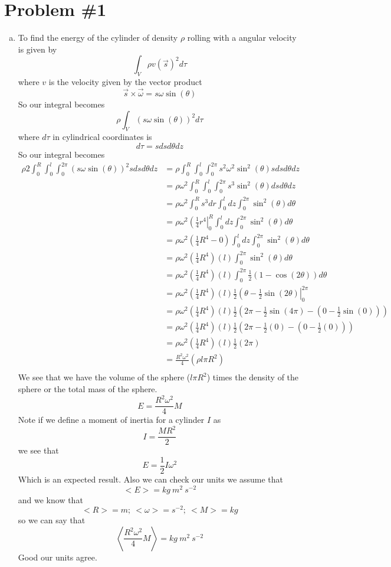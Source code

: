 \documentclass[11pt]{article}
\numberwithin{equation}{section}
\begin{document}


\section{Problem \#1}
\begin{enumerate}[(a)]
\item
To find the energy of the cylinder of density $\rho$ rolling with a angular velocity is given by
$$\int_V \rho v(\vec{s})^2 d\tau$$
where $v$ is the velocity given by the vector product
$$\vec{s}\times\vec{\omega} = s\omega\sin(\theta)$$
So our integral becomes
$${\rho}\int_V  (s\omega\sin(\theta))^2 d\tau$$
where $d\tau$ in cylindrical coordinates is 
$$d\tau = sdsd\theta dz$$
So our integral becomes
\begin{align*}
{\rho}{2}\int_0^R\int_0^l\int_0^{2\pi} (s\omega\sin(\theta))^2 sdsd\theta dz &= {\rho}\int_0^R\int_0^l\int_0^{2\pi} s^2\omega^2\sin^2(\theta) sdsd\theta dz \\
&= {\rho\omega^2}\int_0^R\int_0^l\int_0^{2\pi} s^3\sin^2(\theta)dsd\theta dz \\
&= {\rho\omega^2}\int_0^Rs^3dr\int_0^ldz\int_0^{2\pi}\sin^2(\theta)d\theta \\
&= {\rho\omega^2}\left(\frac{1}{4}r^4\right|_0^R\int_0^ldz\int_0^{2\pi}\sin^2(\theta)d\theta \\
&= {\rho\omega^2}\left(\frac{1}{4}R^4-0\right)\int_0^ldz\int_0^{2\pi}\sin^2(\theta)d\theta \\
&= {\rho\omega^2}\left(\frac{1}{4}R^4\right)(l)\int_0^{2\pi}\sin^2(\theta)d\theta \\
&= {\rho\omega^2}\left(\frac{1}{4}R^4\right)(l)\int_0^{2\pi}\frac{1}{2}(1-\cos(2\theta))d\theta \\
&= {\rho\omega^2}\left(\frac{1}{4}R^4\right)(l)\frac{1}{2}\left(\theta-\frac{1}{2}\sin(2\theta)\right|_0^{2\pi}\\
&= {\rho\omega^2}\left(\frac{1}{4}R^4\right)(l)\frac{1}{2}\left(2\pi-\frac{1}{2}\sin(4\pi)-\left(0-\frac{1}{2}\sin(0)\right)\right)\\
&= {\rho\omega^2}\left(\frac{1}{4}R^4\right)(l)\frac{1}{2}\left(2\pi-\frac{1}{2}(0)-\left(0-\frac{1}{2}(0)\right)\right)\\
&= {\rho\omega^2}\left(\frac{1}{4}R^4\right)(l)\frac{1}{2}\left(2\pi\right)\\
&= \frac{R^2\omega^2}{4}\left(\rho l\pi R^2\right)\\
\end{align*}
We see that we have the volume of the sphere ($l\pi R^2$) times the density of the sphere or the total mass of the sphere.
$$E = \frac{R^2\omega^2}{4}M$$
Note if we define a moment of inertia for a cylinder $I$ as 
$$I = \frac{MR^2}{2}$$
we see that
$$E = \frac{1}{2}I\omega^2$$
Which is an expected result. Also we can check our units we assume that $$<E> = kg\ m^2\ s^{-2}$$
and we know that
$$<R>=m;\ <\omega>=s^{-2};\ <M>=kg$$
so we can say that
$$\left<\frac{R^2\omega^2}{4}M\right> = kg\ {m^2\ s^{-2}}$$
Good our units agree.


\end{enumerate}
\end{document}
